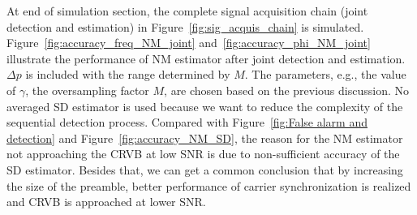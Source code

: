 At end of simulation section, the complete signal acquisition chain (joint detection and estimation) in Figure~\ref{fig:sig_acquis_chain} is simulated.
Figure~\ref{fig:accuracy_freq_NM_joint} and~\ref{fig:accuracy_phi_NM_joint} illustrate the performance of NM estimator after joint detection and 
estimation. $\Delta p$ is included with the range determined by $M$.
The parameters, e.g., the value of $\gamma$, the oversampling factor $M$, are chosen based on the previous discussion.
No averaged SD estimator is used because we want to reduce the complexity of the sequential detection process.
Compared with Figure~\ref{fig:False alarm and detection} and Figure~\ref{fig:accuracy_NM_SD}, the reason for the NM estimator not approaching the CRVB at low SNR
is due to non-sufficient accuracy of the SD estimator. Besides that, we can get a common conclusion that by increasing
the size of the preamble, better performance of carrier synchronization is realized and CRVB is approached at lower SNR.


